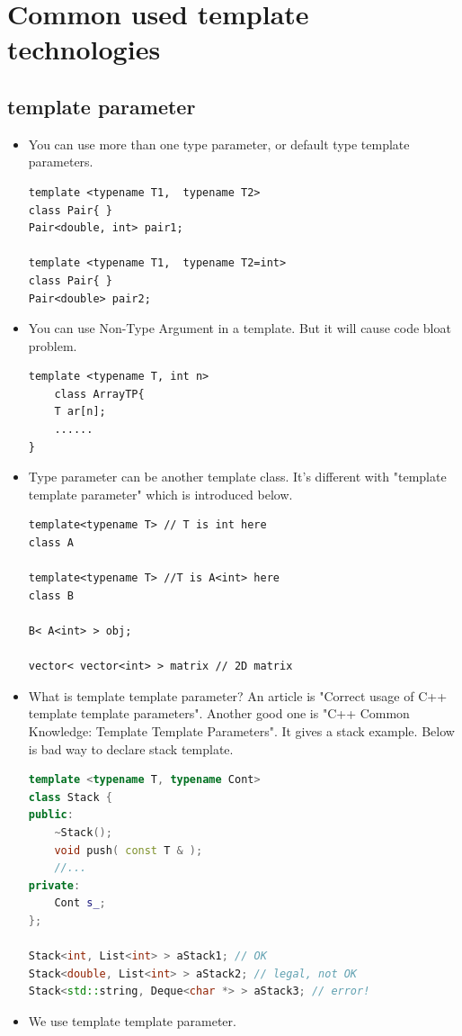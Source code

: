 \documentclass[a4paper,11pt,twoside]{book}
\begin{document}
\section{Common used template technologies}

\subsection{template parameter}

\begin{itemize}
        \item You can use more than one type parameter, or default type template parameters.
\begin{lstlisting}[numbers=none]
template <typename T1,  typename T2>
class Pair{ }
Pair<double, int> pair1;

template <typename T1,  typename T2=int>
class Pair{ }
Pair<double> pair2;
\end{lstlisting}

    \item You can use Non-Type Argument in a template. But it will cause code bloat problem. 
\begin{lstlisting}[numbers=none]
template <typename T, int n>
	class ArrayTP{
	T ar[n];
	......
}
\end{lstlisting}

    \item Type parameter can be another template class.  It's different with "template template parameter" which is introduced below.
\begin{lstlisting}[]
template<typename T> // T is int here
class A

template<typename T> //T is A<int> here
class B

B< A<int> > obj;

vector< vector<int> > matrix // 2D matrix
\end{lstlisting}

    \item What is template template parameter? An article is "Correct usage of C++ template template parameters". Another good one is "C++ Common Knowledge: Template Template Parameters". It gives a stack example. Below is bad way to declare stack template.
\begin{lstlisting}[frame=single, language=c++]
template <typename T, typename Cont>
class Stack {
public:
	~Stack();
	void push( const T & );
	//...
private:
	Cont s_;
};

Stack<int, List<int> > aStack1; // OK
Stack<double, List<int> > aStack2; // legal, not OK           
Stack<std::string, Deque<char *> > aStack3; // error!   
\end{lstlisting}
    \item We use template template parameter. 


\end{itemize}
\end{document}
